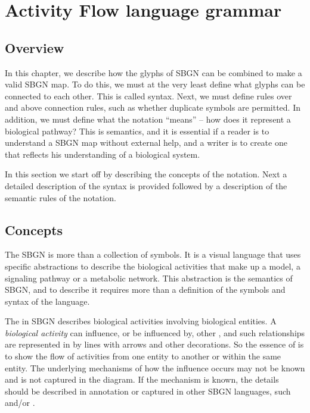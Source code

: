 \chapter{Activity Flow language grammar}
\label{chp:af:grammar}

\section{Overview}
In this chapter, we describe how the glyphs of SBGN \AF can be combined to make a valid SBGN \AF map. To do this, we must at the very least define what glyphs can be connected to each other. This is called syntax. Next, we must define rules over and above connection rules, such as whether duplicate symbols are permitted. In addition, we must define what the notation ``means'' -- how does it represent a biological pathway? This is semantics, and it is essential if a reader is to understand a SBGN map without external help, and a writer is to create one that reflects his understanding of a biological system.

In this section we start off by describing the concepts of the \AF{} notation. Next a detailed description of the syntax is provided
followed by a description of the semantic rules of the notation.

\section{Concepts}

The SBGN \AF{} is more than a collection of symbols. It is a visual language that uses specific abstractions to describe the biological activities that make up a model, a signaling pathway or a metabolic network. This abstraction is the semantics of SBGN, and to describe it requires more than a definition of the symbols and syntax of the language. 

The \AF{} in SBGN describes biological activities involving biological entities. A \emph{biological activity} can influence, or be influenced by, other , and such relationships are represented in \AF by lines with arrows and other decorations. So the essence of \AF is to show the flow of activities from one entity to another or within the same entity. The underlying mechanisms of how the influence occurs may not be known and is not captured in the diagram. If the mechanism is known, the details should be described in annotation or captured in other SBGN languages, such \PD and/or \ER.





